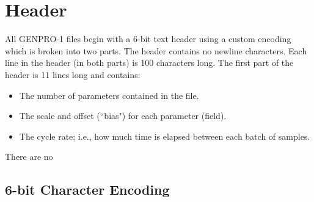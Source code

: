 \documentclass{report}
\begin{document}
\section{Header}

All GENPRO-1 files begin with a 6-bit text header using a custom encoding which
is broken into two parts. The header contains no newline characters. Each line
in the header (in both parts) is 100 characters long. The first part of the
header is 11 lines long and contains:
\begin{itemize}
	\item The number of parameters contained in the file.
	\item The scale and offset (``bias") for each parameter (field).
	\item The cycle rate; i.e., how much time is elapsed between each batch of
	      samples.
\end{itemize}

There are no

%



\subsection{6-bit Character Encoding}
\end{document}
